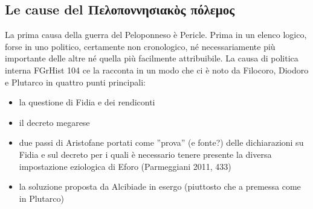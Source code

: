 {            \subsection*{Le cause del \textgreek{Πελοποννησιακὸς πόλεμος}}
            \label{bkm:RefHeading697001501267828}
            La prima causa della guerra del Peloponneso è Pericle. Prima in un elenco logico, forse in uno politico, certamente non cronologico, né necessariamente più importante delle altre né quella più facilmente attribuibile. La causa di politica interna FGrHist 104 ce la racconta in un modo che ci è noto da Filocoro,  Diodoro e Plutarco in quattro punti principali: 
            \begin{itemize}
            \item la questione di Fidia e dei rendiconti
            \item il decreto megarese 
            \item due passi di Aristofane  portati come ''prova'' (e fonte?) delle dichiarazioni su Fidia e sul decreto per i quali è necessario tenere presente la diversa impostazione eziologica di Eforo (Parmeggiani 2011, 433)
            	\item la soluzione proposta da Alcibiade in esergo (piuttosto che a premessa come in Plutarco)
	\end{itemize} 
}
